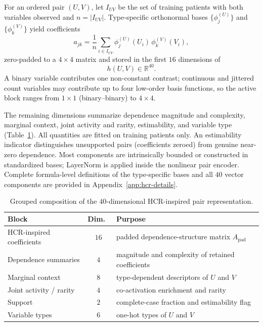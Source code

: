 For an ordered pair $(U,V)$, let $I_{UV}$ be the set of training patients with both variables observed and $n=|I_{UV}|$.
Type-specific orthonormal bases $\{\phi^{(U)}_{j}\}$ and $\{\phi^{(V)}_{k}\}$ yield coefficients
\begin{equation}
\label{eq:taskA-ajk}
a_{jk}
=
\frac{1}{n}
\sum_{i\in I_{UV}}
\phi^{(U)}_{j}(U_i)\,
\phi^{(V)}_{k}(V_i),
\end{equation}
zero-padded to a $4\times 4$ matrix and stored in the first $16$ dimensions of
\begin{equation}
\label{eq:taskA-h40}
h(U,V)\in\mathbb{R}^{40}.
\end{equation}
A binary variable contributes one non-constant contrast; continuous and jittered count variables may contribute up to four low-order basis functions, so the active block ranges from $1\times 1$ (binary--binary) to $4\times 4$.

The remaining dimensions summarize dependence magnitude and complexity, marginal context, joint activity and rarity, estimability, and variable type (Table~\ref{tab:taskA-hcr40}).
All quantities are fitted on training patients only.
An estimability indicator distinguishes unsupported pairs (coefficients zeroed) from genuine near-zero dependence.
Most components are intrinsically bounded or constructed in standardized bases; LayerNorm is applied inside the nonlinear pair encoder.
Complete formula-level definitions of the type-specific bases and all $40$ vector components are provided in Appendix~\ref{app:hcr-details}.

\begin{table}[!ht]
\centering
\footnotesize
\setlength{\tabcolsep}{4pt}
\caption{Grouped composition of the $40$-dimensional HCR-inspired pair representation.}
\label{tab:taskA-hcr40}
\begin{tabular}{@{}lcl@{}}
\toprule
Block & Dim.\ & Purpose \\
\midrule
HCR-inspired coefficients & $16$ & padded dependence-structure matrix $A_{\mathrm{pad}}$ \\
Dependence summaries & $4$ & magnitude and complexity of retained coefficients \\
Marginal context & $8$ & type-dependent descriptors of $U$ and $V$ \\
Joint activity / rarity & $4$ & co-activation enrichment and rarity \\
Support & $2$ & complete-case fraction and estimability flag \\
Variable types & $6$ & one-hot types of $U$ and $V$ \\
\bottomrule
\end{tabular}
\end{table}

